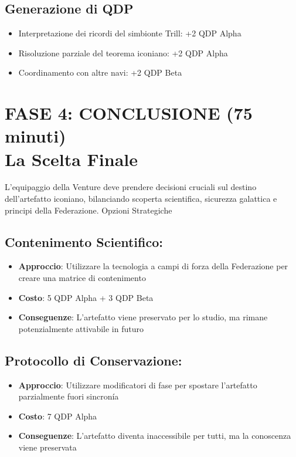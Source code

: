 \documentclass[letterpaper,twocolumn,openany,nodeprecatedcode]{dndbook}
\begin{document}
\subsection{Generazione di QDP}

\begin{itemize}
    \item Interpretazione dei ricordi del simbionte Trill: +2 QDP Alpha
    \item Risoluzione parziale del teorema iconiano: +2 QDP Alpha
    \item Coordinamento con altre navi: +2 QDP Beta
\end{itemize}

\section{FASE 4: CONCLUSIONE (75 minuti) \\ \large{La Scelta Finale}}
L'equipaggio della Venture deve prendere decisioni cruciali sul destino dell'artefatto iconiano, bilanciando scoperta scientifica, sicurezza galattica e principi della Federazione.
Opzioni Strategiche

\subsection{Contenimento Scientifico:}

\begin{itemize}
    \item \textbf{Approccio}: Utilizzare la tecnologia a campi di forza della Federazione per creare una matrice di contenimento
    \item \textbf{Costo}: 5 QDP Alpha + 3 QDP Beta
    \item \textbf{Conseguenze}: L'artefatto viene preservato per lo studio, ma rimane potenzialmente attivabile in futuro
\end{itemize}


\subsection{Protocollo di Conservazione:}

\begin{itemize}
    \item \textbf{Approccio}: Utilizzare modificatori di fase per spostare l'artefatto parzialmente fuori sincronía
    \item \textbf{Costo}: 7 QDP Alpha
    \item \textbf{Conseguenze}: L'artefatto diventa inaccessibile per tutti, ma la conoscenza viene preservata 
\end{itemize}
\end{document}
